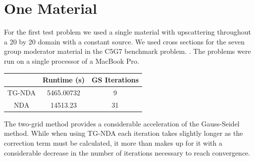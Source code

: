 \section{One Material}
For the first test problem we used a single material with  upscattering throughout a 20 by 20 domain with a constant source. We used cross sections for the seven group moderator material in the C5G7 benchmark problem. \cite{C5G7}.  
The problems were run on a single processor of a MacBook Pro. 
\begin{center}
    \begin{tabular}{|c|c|c|}
    \hline
    & Runtime (s) & GS Iterations \\
    \hline
    TG-NDA & 5465.00732 & 9 \\
    NDA & 14513.23 & 31 \\
    \hline
    \end{tabular}
\end{center}
The two-grid method provides a considerable acceleration of the Gauss-Seidel method. While when using TG-NDA each iteration takes slightly longer as the correction term must be calculated, it more than makes up for it with a considerable decrease in the number of iterations necessary to reach convergence. 
